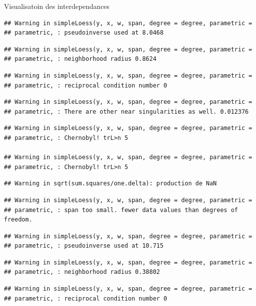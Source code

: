 \documentclass[11pt,ignorenonframetext,]{beamer}
\begin{document}
\begin{frame}[fragile]{Visualisatoin des interdependances}
\begin{verbatim}
## Warning in simpleLoess(y, x, w, span, degree = degree, parametric =
## parametric, : pseudoinverse used at 8.0468
\end{verbatim}

\begin{verbatim}
## Warning in simpleLoess(y, x, w, span, degree = degree, parametric =
## parametric, : neighborhood radius 0.8624
\end{verbatim}

\begin{verbatim}
## Warning in simpleLoess(y, x, w, span, degree = degree, parametric =
## parametric, : reciprocal condition number 0
\end{verbatim}

\begin{verbatim}
## Warning in simpleLoess(y, x, w, span, degree = degree, parametric =
## parametric, : There are other near singularities as well. 0.012376
\end{verbatim}

\begin{verbatim}
## Warning in simpleLoess(y, x, w, span, degree = degree, parametric =
## parametric, : Chernobyl! trL>n 5

## Warning in simpleLoess(y, x, w, span, degree = degree, parametric =
## parametric, : Chernobyl! trL>n 5
\end{verbatim}

\begin{verbatim}
## Warning in sqrt(sum.squares/one.delta): production de NaN
\end{verbatim}

\begin{verbatim}
## Warning in simpleLoess(y, x, w, span, degree = degree, parametric =
## parametric, : span too small. fewer data values than degrees of freedom.
\end{verbatim}

\begin{verbatim}
## Warning in simpleLoess(y, x, w, span, degree = degree, parametric =
## parametric, : pseudoinverse used at 10.715
\end{verbatim}

\begin{verbatim}
## Warning in simpleLoess(y, x, w, span, degree = degree, parametric =
## parametric, : neighborhood radius 0.38802
\end{verbatim}

\begin{verbatim}
## Warning in simpleLoess(y, x, w, span, degree = degree, parametric =
## parametric, : reciprocal condition number 0
\end{verbatim}


\end{frame}
\end{document}
